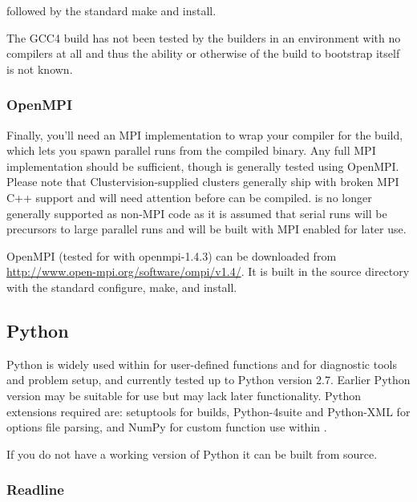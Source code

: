 followed by the standard make and install.

The GCC4 build has not been tested by the \fluidity builders in an environment
with no compilers at all and thus the ability or otherwise of the build to
bootstrap itself is not known.

\subsubsection{OpenMPI}
\label{sec:required_libraries_compilers_openmpi}

Finally, you'll need an MPI implementation to wrap your compiler for the
\fluidity build, which lets you spawn parallel runs from the compiled \fluidity
binary. Any full MPI implementation should be sufficient, though \fluidity is
generally tested using OpenMPI. Please note that Clustervision-supplied
clusters generally ship with broken MPI C++ support and will need attention
before \fluidity can be compiled. \fluidity is no longer generally supported as
non-MPI code as it is assumed that serial runs will be precursors to large
parallel runs and will be built with MPI enabled for later use.

OpenMPI (tested for \fluidity with openmpi-1.4.3) can be downloaded from
\url{http://www.open-mpi.org/software/ompi/v1.4/}. It is built in the source
directory with the standard configure, make, and install.

\subsection{Python}
\label{sec:required_libraries_python}

Python is widely used within \fluidity for user-defined functions and for
diagnostic tools and problem setup, and currently tested up to Python version
2.7. Earlier Python version may be suitable for use but may lack later
functionality. Python extensions required are: setuptools for \fluidity builds,
Python-4suite and Python-XML for options file parsing, and NumPy for custom
function use within \fluidity.

If you do not have a working version of Python it can be built from source. 

\subsubsection{Readline}
\label{sec:required_libraries_python_readline}

